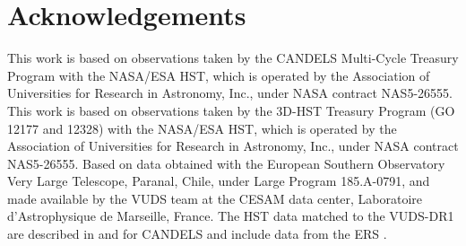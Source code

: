 \documentclass[fleqn,usenatbib]{mn2e}
\begin{document}
\section*{Acknowledgements}

This work is based on observations taken by the CANDELS Multi-Cycle Treasury Program with the NASA/ESA HST, which is operated by the Association of Universities for Research in Astronomy, Inc., under NASA contract NAS5-26555.
This work is based on observations taken by the 3D-HST Treasury Program (GO 12177 and 12328) with the NASA/ESA HST, which is operated by the Association of Universities for Research in Astronomy, Inc., under NASA contract NAS5-26555.
Based on data obtained with the European Southern Observatory Very Large Telescope, Paranal, Chile, under Large Program 185.A-0791, and made available by the VUDS team at the CESAM data center, Laboratoire d'Astrophysique de Marseille, France.
The HST data matched to the VUDS-DR1 are described in \cite{Grogin2011} and \cite{Koekemoer2011} for CANDELS and include data from the ERS \cite{Windhorst2011}.




%


\clearpage 

%


\end{document}
